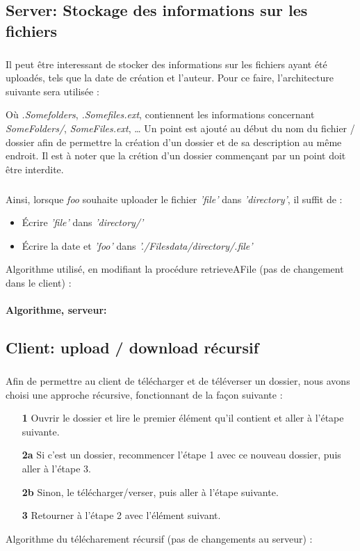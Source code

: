 \documentclass[12pt,a4paper,twoside]{article}
\begin{document}
		\subsection{Server: Stockage des informations sur les fichiers} %
			\subparagraph*{}
				Il peut être interessant de stocker des informations sur les fichiers ayant été uploadés, tels que la date de création et l'auteur.
				Pour ce faire, l'architecture suivante sera utilisée :
				\begin{samepage}
					
				\end{samepage}
				Où \textit{.Somefolders}, \textit{.Somefiles.ext}, \ldost{} contiennent les informations concernant \textit{SomeFolders/}, \textit{SomeFiles.ext}, \ldots{}
				Un point est ajouté au début du nom du fichier / dossier afin de permettre la création d'un dossier et de sa description au même endroit. Il est à noter que la crétion d'un dossier commençant par un point doit être interdite.
			\subparagraph*{}
				Ainsi, lorsque \textit{foo} souhaite uploader le fichier \textit{'file'} dans \textit{'directory'}, il suffit de :
				\begin{itemize}
					\item{} Écrire \textit{'file'} dans \textit{'directory/'}
					\item{} Écrire la date et \textit{'foo'} dans \textit{'./Filesdata/directory/.file'}
				\end{itemize}
				Algorithme utilisé, en modifiant la procédure retrieveAFile (pas de changement dans le client) :
			\paragraph*{Algorithme, serveur:}
				
				
		\subsection{Client: upload / download récursif} %
			\subparagraph*{}
				Afin de permettre au client de télécharger et de téléverser un dossier, nous avons choisi une approche récursive, fonctionnant de la façon suivante :
				\begin{itemize}
					\item[\textbf{1 }]{} Ouvrir le dossier et lire le premier élément qu'il contient et aller à l'étape suivante.
					\item[\textbf{2a}]{} Si c'est un dossier, recommencer l'étape 1 avec ce nouveau dossier, puis aller à l'étape 3.
					\item[\textbf{2b}]{} Sinon, le télécharger/verser, puis aller à l'étape suivante.
					\item[\textbf{3 }]{} Retourner à l'étape 2 avec l'élément suivant.
				\end{itemize}
				Algorithme du télécharement récursif (pas de changements au serveur) :
\end{document}
